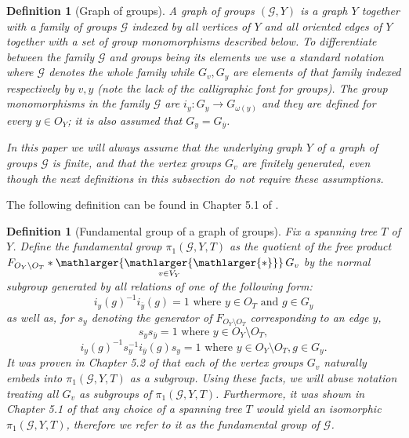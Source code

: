 \documentclass[12pt, a4paper]{article}
\newcommand{\8}{\infty}
\theoremstyle{break}
\theoremstyle{defbreak}
\newtheorem{df}[thm]{Definition}
\newcommand{\ol}[1]{\overline{#1}}
\renewcommand{\bigstar}{\mathop{\mathlarger{\mathlarger{\mathlarger{*}}}}}
\begin{document}

\begin{df}[Graph of groups]
    A \textit{graph of groups} $(\mathcal{G},Y)$ is a graph $Y$ together with a family of groups $\mathcal{G}$ indexed by all vertices of $Y$ and all oriented edges of $Y$ together with a set of group monomorphisms described below. To differentiate between the family $\mathcal{G}$ and groups being its elements we use a standard notation where $\mathcal{G}$ denotes the whole family while $G_v, G_y$ are elements of that family indexed respectively by $v, y$ (note the lack of the calligraphic font for groups). The group monomorphisms in the family $\mathcal{G}$ are $i_y:G_y \to G_{\omega(y)}$ and they are defined for every $y\in O_Y$; it is also assumed that $G_y = G_{\ol{y}}$. 

    In this paper we will always assume that the underlying graph $Y$ of a graph of groups $\mathcal G$ is finite, and that the vertex groups $G_v$ are finitely generated, even though the next definitions in this subsection do not require these assumptions.
\end{df}

The following definition can be found in Chapter 5.1 of \cite{serre-trees}.\medskip

\begin{df}[Fundamental group of a graph of groups]\label{def:fundamental_group_of_gog}
    Fix a spanning tree $T$ of $Y$. Define the \textit{fundamental group} $\pi_1(\mathcal{G},Y,T)$ as the quotient of the free product $\displaystyle{F_{O_Y\setminus O_T}*\bigstar_{v\in V_Y}G_v}$ by the normal subgroup generated by all relations of one of the following form:
    $$i_y(g)^{-1}i_{\ol{y}}(g) = 1\text{ where }y\in O_T\text{ and }g\in G_y$$
    as well as, for $s_y$ denoting the generator of $F_{O_Y\setminus O_T}$ corresponding to an edge $y$,
    $$s_ys_{\ol{y}} = 1\text{ where }y\in O_Y\setminus O_T,$$
    $$i_y(g)^{-1}s_{y}^{-1}i_{\ol{y}}(g)s_{y} = 1\text{ where }y\in O_Y\setminus O_T,g\in G_y.$$
    It was proven in Chapter 5.2 of \cite{serre-trees} that each of the vertex groups $G_v$  
    naturally embeds into $\pi_1(\mathcal{G}, Y, T)$ as a subgroup. 
    Using these facts, we will abuse notation treating all $G_v$ as subgroups of $\pi_1(\mathcal{G},Y,T)$. Furthermore, it was shown in Chapter 5.1 of \cite{serre-trees} that any choice of a spanning tree $T$ would yield an isomorphic $\pi_1(\mathcal{G},Y,T)$, therefore we refer to it as the fundamental group of $\mathcal{G}$.
\end{df}
\end{document}
